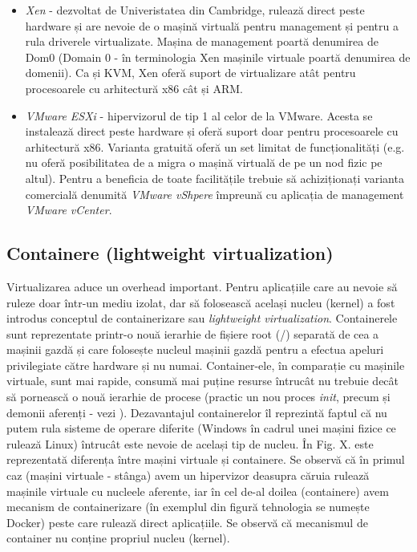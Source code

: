 \begin{itemize}
	\item \textit{Xen} - dezvoltat de Univeristatea din Cambridge, rulează
		direct peste hardware și are nevoie de o mașină virtuală pentru
		management și pentru a rula driverele virtualizate. Mașina de
		management poartă denumirea de Dom0 (Domain 0 - în terminologia
		Xen mașinile virtuale poartă denumirea de domenii). Ca și KVM,
		Xen oferă suport de virtualizare atât pentru procesoarele cu
		arhitectură x86 cât și ARM.
	\item \textit{VMware ESXi} - hipervizorul de tip 1 al celor de la
		VMware. Acesta se instalează direct peste hardware și oferă
		suport doar pentru procesoarele cu arhitectură x86. Varianta
		gratuită oferă un set limitat de funcționalități (e.g. nu oferă
		posibilitatea de a migra o mașină virtuală de pe un nod fizic pe
		altul). Pentru a beneficia de toate facilitățile trebuie să
		achiziționați varianta comercială denumită \textit{VMware
		vShpere} împreună cu aplicația de management \textit{VMware
		vCenter}.
\end{itemize}

\subsection{Containere (lightweight virtualization)}
\label{sec:vm-intro-containers}

Virtualizarea aduce un overhead important. Pentru aplicațiile care au nevoie să
ruleze doar într-un mediu izolat, dar să folosească același nucleu (kernel) a
fost introdus conceptul de containerizare sau \textit{lightweight
virtualization}. Containerele sunt reprezentate printr-o nouă ierarhie de
fișiere root (/) separată de cea a mașinii gazdă și care folosește nucleul
mașinii gazdă pentru a efectua apeluri privilegiate către hardware și nu numai.
Container-ele, în comparație cu mașinile virtuale, sunt mai rapide, consumă mai
puține resurse întrucât nu trebuie decât să pornească o nouă ierarhie de procese
(practic un nou proces \textit{init}, precum și demonii aferenți - vezi
). Dezavantajul containerelor îl
reprezintă faptul că nu putem rula sisteme de operare diferite (Windows în
cadrul unei mașini fizice ce rulează Linux) întrucât este nevoie de același tip
de nucleu. În Fig. X. este reprezentată diferența între mașini virtuale și
containere. Se observă că în primul caz (mașini virtuale - stânga) avem un
hipervizor deasupra căruia rulează mașinile virtuale cu nucleele aferente, iar
în cel de-al doilea (containere) avem mecanism de containerizare (în exemplul
din figură tehnologia se numește Docker) peste care rulează direct aplicațiile.
Se observă că mecanismul de container nu conține propriul nucleu (kernel).

